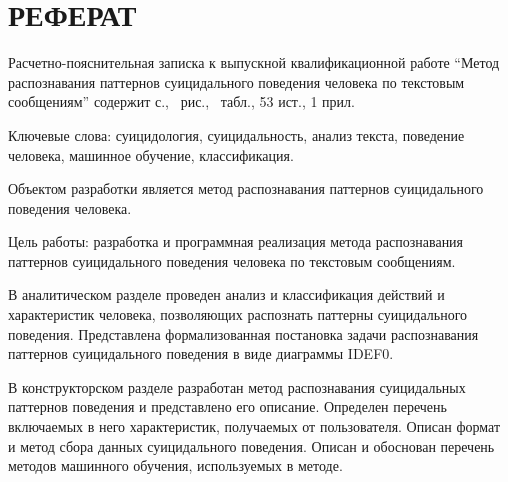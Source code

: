 \section*{РЕФЕРАТ}

Расчетно-пояснительная записка к выпускной квалификационной работе ``Метод распознавания паттернов суицидального поведения человека по текстовым сообщениям'' содержит \pageref{LastPage} с., \totalfigures\ рис., \totaltables\ табл., 53 ист., 1 прил.

Ключевые слова: суицидология, суицидальность, анализ текста, поведение человека, машинное обучение, классификация.

Объектом разработки является метод распознавания паттернов суицидального поведения человека.

Цель работы: разработка и программная реализация метода распознавания паттернов суицидального поведения человека по текстовым сообщениям.

В аналитическом разделе проведен анализ и классификация действий и характеристик человека, позволяющих распознать паттерны суицидального поведения. 
Представлена формализованная постановка задачи распознавания паттернов суицидального поведения в виде диаграммы IDEF0.


В конструкторском разделе разработан метод распознавания суицидальных паттернов поведения и представлено его описание.
Определен перечень включаемых в него характеристик, получаемых от пользователя.
Описан формат и метод сбора данных суицидального поведения.
Описан и обоснован перечень методов машинного обучения, используемых в методе.


